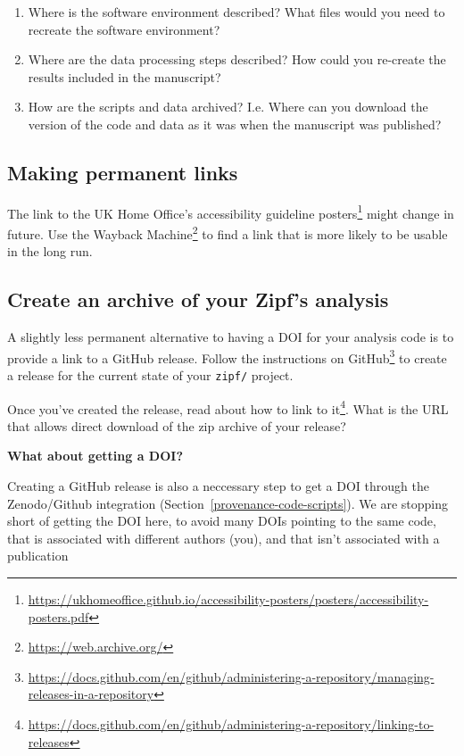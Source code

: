 \documentclass[
]{krantz}
\providecommand{\tightlist}{%
  \setlength{\itemsep}{0pt}\setlength{\parskip}{0pt}}
\renewenvironment{quote}{\begin{VF}}{\end{VF}}
\renewcommand{\href}[2]{#2\footnote{\url{#1}}}
\begin{document}
\begin{enumerate}
\def\labelenumi{\arabic{enumi}.}
\tightlist
\item
  Where is the software environment described? What files would you need to recreate the software environment?
\item
  Where are the data processing steps described? How could you re-create the results included in the manuscript?
\item
  How are the scripts and data archived?
  I.e. Where can you download the version of the code and data as it was when the manuscript was published?
\end{enumerate}

\hypertarget{provenance-ex-permanent-links}{%
\subsection{Making permanent links}\label{provenance-ex-permanent-links}}

The link to the UK Home Office's \href{https://ukhomeoffice.github.io/accessibility-posters/posters/accessibility-posters.pdf}{accessibility guideline posters} might change in future.
Use the \href{https://web.archive.org/}{Wayback Machine} to find a link that is more likely to be usable in the long run.

\hypertarget{provenance-ex-release}{%
\subsection{Create an archive of your Zipf's analysis}\label{provenance-ex-release}}

A slightly less permanent alternative to having a DOI for your analysis code
is to provide a link to a GitHub release.
Follow \href{https://docs.github.com/en/github/administering-a-repository/managing-releases-in-a-repository}{the instructions on GitHub} to create a release for the current state of your \texttt{zipf/} project.

Once you've created the release,
\href{https://docs.github.com/en/github/administering-a-repository/linking-to-releases}{read about how to link to it}.
What is the URL that allows direct download of the zip archive
of your release?

\begin{quote}
\textbf{What about getting a DOI?}

Creating a GitHub release is also a neccessary step
to get a DOI through the Zenodo/Github integration
(Section~\ref{provenance-code-scripts}).
We are stopping short of getting the DOI here,
to avoid many DOIs pointing to the same code,
that is associated with different authors (you),
and that isn't associated with a publication
\end{quote}
\end{document}
